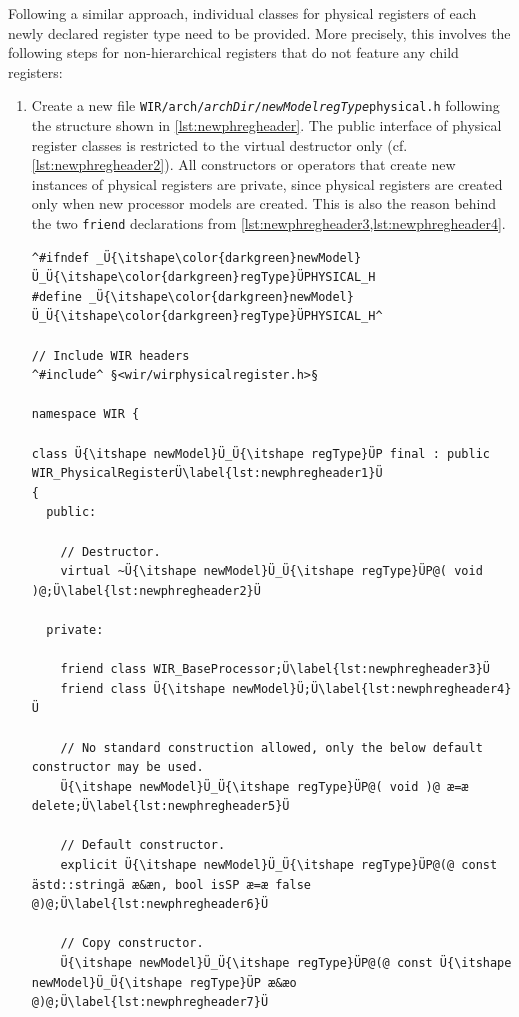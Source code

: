 Following a similar approach, individual classes for physical registers of each newly declared register type need to be provided.
More precisely, this involves the following steps for non-hierarchical registers that do not feature any child registers:

\begin{enumerate}[resume]
  \item Create a new file \texttt{WIR/arch/{\itshape archDir}/{\itshape newModelregType}physical.h} following the structure shown in \cref{lst:newphregheader}.
  The public interface of physical register classes is restricted to the virtual destructor only (cf. \cref{lst:newphregheader2}).
  All constructors or operators that create new instances of physical registers are private, since physical registers are created only when new processor models are created.
  This is also the reason behind the two \texttt{friend} declarations from \cref{lst:newphregheader3,lst:newphregheader4}.

\begin{lstlisting}[style=code,float=!t,caption={Header File for a New Physical Register's Class},label=lst:newphregheader]
^#ifndef _Ü{\itshape\color{darkgreen}newModel}Ü_Ü{\itshape\color{darkgreen}regType}ÜPHYSICAL_H
#define _Ü{\itshape\color{darkgreen}newModel}Ü_Ü{\itshape\color{darkgreen}regType}ÜPHYSICAL_H^

// Include WIR headers
^#include^ §<wir/wirphysicalregister.h>§

namespace WIR {

class Ü{\itshape newModel}Ü_Ü{\itshape regType}ÜP final : public WIR_PhysicalRegisterÜ\label{lst:newphregheader1}Ü
{
  public:

    // Destructor.
    virtual ~Ü{\itshape newModel}Ü_Ü{\itshape regType}ÜP@( void )@;Ü\label{lst:newphregheader2}Ü

  private:

    friend class WIR_BaseProcessor;Ü\label{lst:newphregheader3}Ü
    friend class Ü{\itshape newModel}Ü;Ü\label{lst:newphregheader4}Ü

    // No standard construction allowed, only the below default constructor may be used.
    Ü{\itshape newModel}Ü_Ü{\itshape regType}ÜP@( void )@ æ=æ delete;Ü\label{lst:newphregheader5}Ü

    // Default constructor.
    explicit Ü{\itshape newModel}Ü_Ü{\itshape regType}ÜP@(@ const ästd::stringä æ&æn, bool isSP æ=æ false @)@;Ü\label{lst:newphregheader6}Ü

    // Copy constructor.
    Ü{\itshape newModel}Ü_Ü{\itshape regType}ÜP@(@ const Ü{\itshape newModel}Ü_Ü{\itshape regType}ÜP æ&æo @)@;Ü\label{lst:newphregheader7}Ü


\end{lstlisting}
\end{enumerate}
